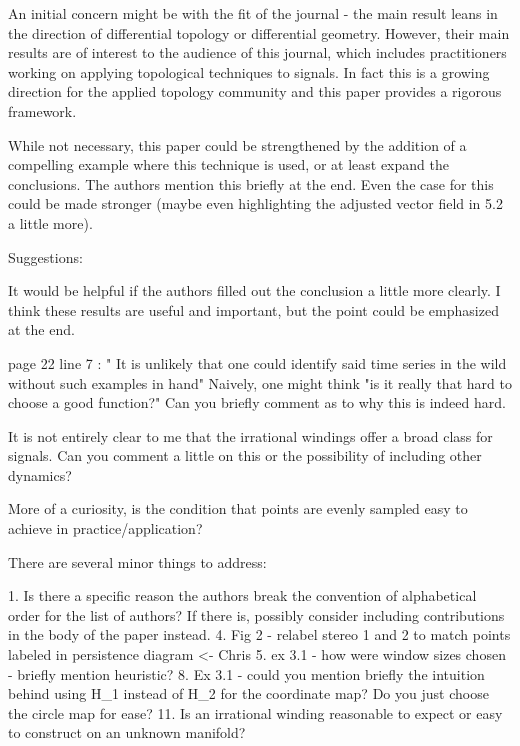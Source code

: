 An initial concern might be with the fit of the journal - the main result leans in the direction of differential topology or differential geometry. However, their main results are of interest to the audience of this journal, which includes practitioners working on applying topological techniques to signals. In fact this is a growing direction for the applied topology community and this paper provides a rigorous framework.





While not necessary, this paper could be strengthened by the addition of a compelling example where this technique is used, or at least expand the conclusions. The authors mention this briefly at the end. Even the case for this could be made stronger (maybe even highlighting the adjusted vector field in 5.2 a little more).



Suggestions:

It would be helpful if the authors filled out the conclusion a little more clearly. I think these results are  useful and important, but the point could be emphasized at the end.

page 22 line 7 : " It is unlikely that one could identify said time series in the wild without such examples in hand"  Naively, one might think "is it really that hard to choose a good function?" Can you briefly comment as to why this is indeed hard.

It is not entirely clear to me that the irrational windings offer a broad class for signals. Can you comment a little on this or  the possibility of including other dynamics?

More of a curiosity, is the condition that points are evenly sampled easy to achieve in practice/application?

There are several minor things to address:

    1. Is there a specific reason the authors break the convention of alphabetical order for the list of authors? If there is, possibly consider including contributions in the body of the paper instead.
    4. Fig 2 - relabel stereo 1 and 2 to match points labeled in persistence diagram   <- Chris
    5. ex 3.1 - how were window sizes chosen - briefly mention heuristic?
    8. Ex 3.1 - could you mention briefly the intuition behind using H_1 instead of H_2 for the coordinate map? Do you just choose the circle map for ease?
    11. Is an irrational winding reasonable to expect or easy to construct on an unknown manifold?
